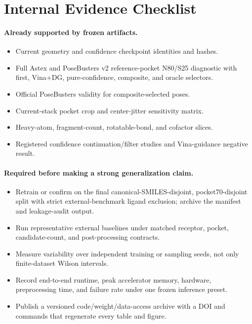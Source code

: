 \section*{Internal Evidence Checklist}

\paragraph{Already supported by frozen artifacts.}
\begin{itemize}
    \item Current geometry and confidence checkpoint identities and hashes.
    \item Full Astex and PoseBusters v2 reference-pocket N80/S25
    diagnostic with first, Vina+DG, pure-confidence, composite, and oracle
    selectors.
    \item Official PoseBusters validity for composite-selected poses.
    \item Current-stack pocket crop and center-jitter sensitivity matrix.
    \item Heavy-atom, fragment-count, rotatable-bond, and cofactor slices.
    \item Registered confidence continuation/filter studies and Vina-guidance
    negative result.
\end{itemize}

\paragraph{Required before making a strong generalization claim.}
\begin{itemize}
    \item Retrain or confirm on the final canonical-SMILES-disjoint,
    pocket70-disjoint split with strict external-benchmark ligand exclusion;
    archive the manifest and leakage-audit output.
    \item Run representative external baselines under matched receptor,
    pocket, candidate-count, and post-processing contracts.
    \item Measure variability over independent training or sampling seeds, not
    only finite-dataset Wilson intervals.
    \item Record end-to-end runtime, peak accelerator memory, hardware,
    preprocessing time, and failure rate under one frozen inference preset.
    \item Publish a versioned code/weight/data-access archive with a DOI and
    commands that regenerate every table and figure.
\end{itemize}

